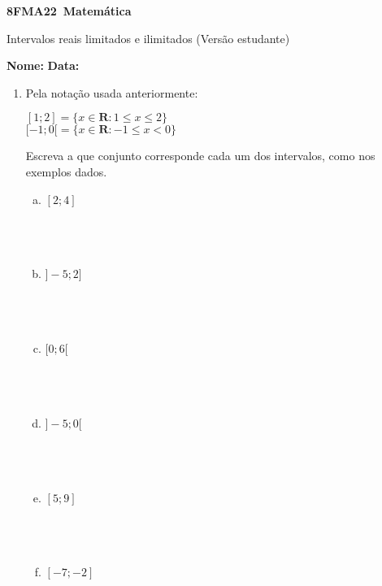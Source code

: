\documentclass[a4paper,14pt]{article}
\begin{document}
	
	\noindent\textbf{8FMA22~Matemática} 
	
	\begin{center}Intervalos reais limitados e ilimitados (Versão estudante)
	\end{center}
	
	\noindent\textbf{Nome:} \underline{\hspace{10cm}}
	\noindent\textbf{Data:} \underline{\hspace{4cm}}
	
 
	\begin{multicols}{2}
		\begin{enumerate}
			\item Pela notação usada anteriormente:
			\begin{center}
				$[1;2] = \{x \in \mathbb{\textbf{R}}:1 \leq x \leq 2 \}$ \\
				$[-1;0[ = \{x \in \mathbb{\textbf{R}}:-1 \leq x < 0\}$
			\end{center}
			Escreva a que conjunto corresponde cada um dos intervalos, como nos exemplos dados.
			\begin{enumerate}[a)]
				\item $[2; 4]$ \\\\\\\\
				\item $]-5; 2]$ \\\\\\\\
				\item $[0; 6[$ \\\\\\\\
				\item $]-5; 0[$ \\\\\\\\
				\item $[5; 9]$ \\\\\\\\
				\item $[-7; -2]$ \\\\\\\\

\end{enumerate}
\end{enumerate}
\end{multicols}
\end{document}
